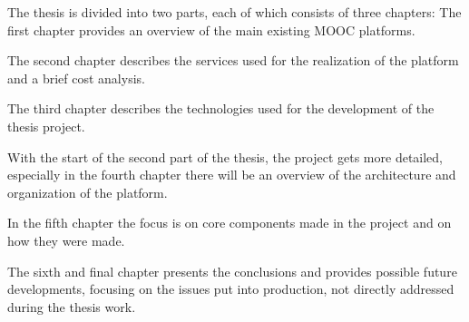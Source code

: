 The thesis is divided into two parts, each of which consists of three chapters:
The first chapter provides an overview of the main existing MOOC platforms.

The second chapter describes the services used for the realization of the platform and a brief cost analysis.

The third chapter describes the technologies used for the development of the thesis project.

With the start of the second part of the thesis, the project gets more detailed, especially in the fourth chapter there will be an overview of the architecture and organization of the platform.

In the fifth chapter the focus is on core components made in the project and on how they were made.

The sixth and final chapter presents the conclusions and provides possible future developments, focusing on the issues put into production, not directly addressed during the thesis work.